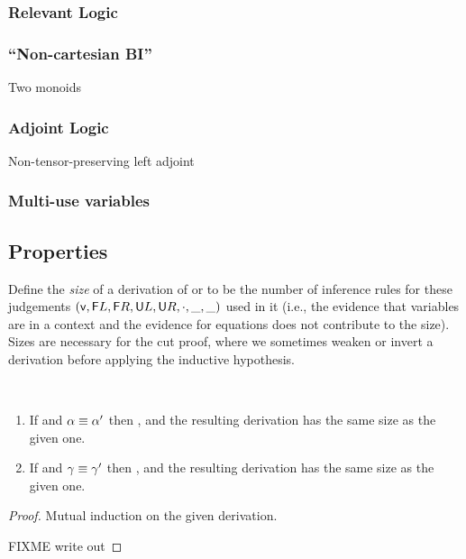 \subsubsection{Relevant Logic}

\subsubsection{``Non-cartesian BI''} Two monoids

\subsubsection{Adjoint Logic} Non-tensor-preserving left adjoint

\subsubsection{Multi-use variables}

\subsection{Properties}

Define the \emph{size} of a derivation of  or
\seq{\Gamma}{\gamma}{\Delta} to be the number of inference rules for
these judgements $(\mathsf{v},\mathsf{F} L, \mathsf{F} R, \mathsf{U} L, \mathsf{U} R,
\cdot, \_,\_)$ used in it (i.e., the evidence that variables are in a
context and the evidence for equations does not contribute to the size).
Sizes are necessary for the cut proof, where we sometimes weaken or
invert a derivation before applying the inductive hypothesis.

\begin{lemma} ~
\begin{enumerate}
\item If  and $\alpha \equiv \alpha'$ then
, and the resulting derivation has the same size
as the given one.
\item If \seq{\Gamma}{\gamma}{\Delta} and $\gamma \equiv \gamma'$ then
  , and the resulting derivation has the
  same size as the given one.
\end{enumerate}
\end{lemma}
\begin{proof}
Mutual induction on the given derivation.  

FIXME write out
\end{proof}

